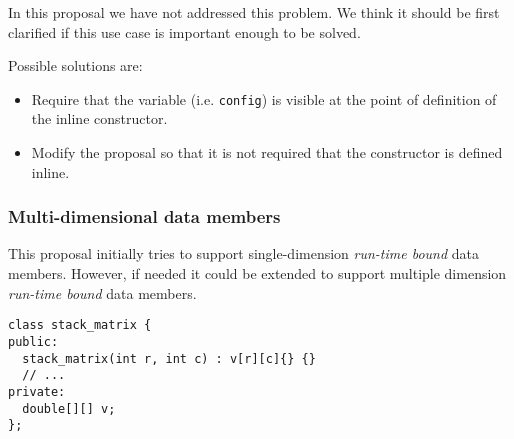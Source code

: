 In this proposal we have not addressed this problem. We think it should be first
clarified if this use case is important enough to be solved.

Possible solutions are:

\begin{itemize}

\item Require that the variable (i.e. \verb+config+) is visible at the point of definition of the
inline constructor.

\item Modify the proposal so that it is not required that the constructor is
defined inline.

\end{itemize}

\subsubsection{Multi-dimensional data members}

This proposal initially tries to support single-dimension \emph{run-time bound}
data members. However, if needed it could be extended to support multiple
dimension \emph{run-time bound} data members.

\begin{lstlisting}
class stack_matrix {
public:
  stack_matrix(int r, int c) : v[r][c]{} {}
  // ...
private:
  double[][] v;
};
\end{lstlisting}

